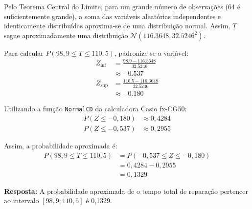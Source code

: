 \documentclass[a4paper,12pt]{article}
\begin{document}
\begin{enumerate}
\begin{mdframed}[backgroundcolor=gray!10, linewidth=0pt, innertopmargin=10pt, innerbottommargin=10pt]
  Pelo Teorema Central do Limite, para um grande número de observações (64 é suficientemente grande), a soma das variáveis aleatórias independentes e identicamente distribuídas aproxima-se de uma distribuição normal. Assim, \( T \) segue aproximadamente uma distribuição \( \mathcal{N}(116.3648, 32.5246^2) \).

  Para calcular \( P(98,9 \leq T \leq 110,5) \), padronize-se a variável:
  \begin{align*}
    Z_{\text{inf}} &= \frac{98.9 - 116.3648}{32.5246} \\
    &\approx -0.537 \\
    Z_{\text{sup}} &= \frac{110.5 - 116.3648}{32.5246} \\
    &\approx -0.180
  \end{align*}

  Utilizando a função \texttt{NormalCD} da calculadora Casio fx-CG50:
  \begin{align*}
    P(Z \leq -0,180) &\approx 0,4284 \\
    P(Z \leq -0,537) &\approx 0,2955
  \end{align*}

  Assim, a probabilidade aproximada é:
  \begin{align*}
    P(98,9 \leq T \leq 110,5) &= P(-0,537 \leq Z \leq -0,180) \\
    &= 0,4284 - 0,2955 \\
    &= 0,1329
  \end{align*}

  \textbf{Resposta:} A probabilidade aproximada de o tempo total de reparação pertencer ao intervalo \([98,9; 110,5]\) é 0,1329.
  \end{mdframed}
\end{enumerate}
\end{document}
